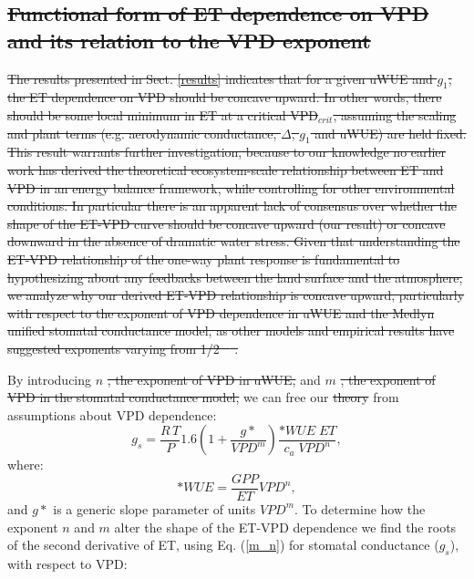 \documentclass[hess, manuscript]{copernicus}
\providecommand{\DIFaddtex}[1]{{\protect\color{blue}\uwave{#1}}} %
\providecommand{\DIFdeltex}[1]{{\protect\color{red}\sout{#1}}}                      %
\providecommand{\DIFaddbegin}{} %
\providecommand{\DIFaddend}{} %
\providecommand{\DIFdelbegin}{} %
\providecommand{\DIFdelend}{} %
\providecommand{\DIFadd}[1]{\texorpdfstring{\DIFaddtex{#1}}{#1}} %
\providecommand{\DIFdel}[1]{\texorpdfstring{\DIFdeltex{#1}}{}} %
\begin{document}
\subsection{\DIFdel{Functional form of ET dependence on VPD and its relation
  to the VPD exponent}}
\addtocounter{subsection}{-1}%

\DIFdel{The results presented in Sect. \ref{results} indicates that for a
given uWUE and $g_1$, the ET dependence on VPD should be concave
upward. In other words, there should be some local minimum in ET at a
critical VPD$_{crit}$, assuming the scaling and plant terms
(e.g. aerodynamic conductance, $\Delta$, $g_1$ and uWUE) are held
fixed. This result warrants further investigation, because to our
knowledge no earlier work has derived the theoretical ecosystem-scale
relationship between ET and VPD in an energy balance framework, while
controlling for other environmental conditions. In particular there is
an apparent lack of consensus over whether the shape of the ET-VPD
curve should be concave upward (our result) or concave downward in the
absence of dramatic water stress. Given that understanding the ET-VPD
relationship of the one-way plant response is fundamental to
hypothesizing about any feedbacks between the land surface and the
atmosphere, we analyze why our derived ET-VPD relationship is concave
upward, particularly with respect to the exponent of VPD dependence in
uWUE and the Medlyn unified stomatal conductance model, as other
models and empirical results have suggested exponents varying from 1/2
\mbox{%
\citep{Leuning_1990, Zhou_2015, Lin_2018}}%
.
}\DIFdelend

By introducing $n$ \DIFdelbegin \DIFdel{, the exponent of VPD in uWUE, }\DIFdelend and $m$ \DIFdelbegin \DIFdel{, the exponent
of VPD in the stomatal conductance model, }\DIFdelend we can free our \DIFdelbegin \DIFdel{theory }\DIFdelend \DIFaddbegin \DIFadd{stomatal
conductance model }\DIFaddend from assumptions about VPD dependence:
  \begin{equation}
    g_s = \frac{R \, T}{P} 1.6 \left(1 + \frac{g*}{VPD^m}\right) \frac{*WUE \; ET}{c_a \; VPD^n},
    \label{m_n}
  \end{equation}
where:
\[*WUE = \frac{GPP}{ET}VPD^n,\] and $g*$ is a generic slope parameter
of units $VPD^m$. To determine how the exponent $n$ and $m$ alter the
shape of the ET-VPD dependence we find the roots of the second
derivative of ET, using Eq. (\ref{m_n}) for stomatal conductance
($g_s$), with respect to VPD: \DIFdelbegin %
\end{document}
